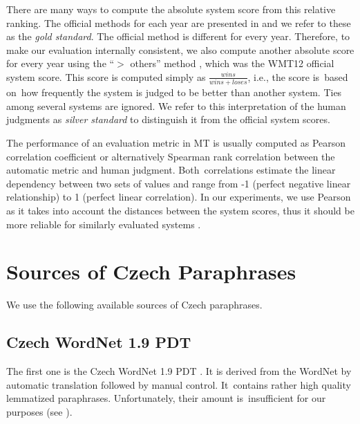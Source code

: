 There are many ways to compute the absolute system score from this relative
ranking. The official methods for each year are presented in  
and we refer to these as the \textit{gold standard}. The official method is
different for every year. Therefore, to make our evaluation internally 
consistent, we also compute another absolute score for every year using the 
“$ >$ others” method \citep{bojar-grains}, which was the WMT12 official system
score. This score is computed simply as $\frac{wins}{wins+loses} $, i.e., the 
score is~based on~how frequently the system is judged to be better than 
another system. Ties among several systems are ignored. We refer to this 
interpretation of the human judgments as \textit{silver standard} to distinguish
it from the official system scores. %

The performance of an evaluation metric in MT is usually computed as Pearson 
correlation coefficient or alternatively Spearman rank correlation between the 
automatic metric and human judgment. Both~correlations estimate the linear 
dependency between two sets of values and range from -1 (perfect negative 
linear relationship) to 1 (perfect linear correlation). In our experiments, we use
Pearson as it takes into account the distances between the system scores, thus 
it should be more reliable for similarly evaluated systems 
\citep{machacek-bojar-2014-results}.

\section{Sources of Czech Paraphrases}
We use the following available sources of Czech paraphrases.

\subsection{Czech WordNet 1.9 PDT}
The first one is the Czech WordNet 1.9 PDT \citep{czech-wordnet}. It is derived 
from the WordNet \cite{wordnet} by automatic translation followed by manual 
control. It~contains rather high quality lemmatized paraphrases. Unfortunately, 
their amount is~insufficient for our purposes (see ). 


